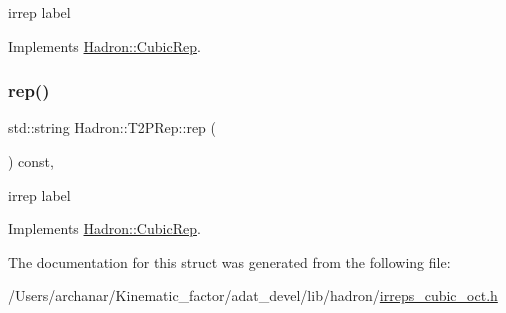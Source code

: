 irrep label 

Implements \mbox{\hyperlink{structHadron_1_1CubicRep_ac3eb63608803d44c68681f158e14eb1b}{Hadron\+::\+Cubic\+Rep}}.

\mbox{\label{structHadron_1_1T2PRep_a34a7ab2061f6a666c64ba2b44e0f203d}} 
\subsubsection{\texorpdfstring{rep()}{rep()}\hspace{0.1cm}{\footnotesize\ttfamily [2/2]}}
{\footnotesize\ttfamily std\+::string Hadron\+::\+T2\+P\+Rep\+::rep (\begin{DoxyParamCaption}{ }\end{DoxyParamCaption}) const\hspace{0.3cm}{\ttfamily [inline]}, {\ttfamily [virtual]}}

irrep label 

Implements \mbox{\hyperlink{structHadron_1_1CubicRep_ac3eb63608803d44c68681f158e14eb1b}{Hadron\+::\+Cubic\+Rep}}.



The documentation for this struct was generated from the following file\+:\begin{DoxyCompactItemize}
\item 
/\+Users/archanar/\+Kinematic\+\_\+factor/adat\+\_\+devel/lib/hadron/\mbox{\hyperlink{lib_2hadron_2irreps__cubic__oct_8h}{irreps\+\_\+cubic\+\_\+oct.\+h}}\end{DoxyCompactItemize}
